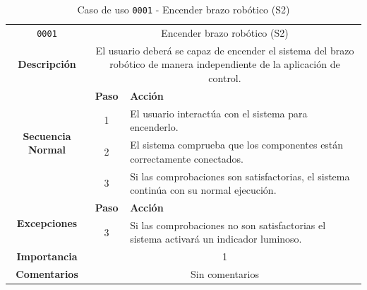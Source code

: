 \begin{table}[H]
    \centering
    \begin{tabularx}{\textwidth}{|c|c|X|}
        \cline{1-3}
        \texttt{0001}                              & \multicolumn{2}{c|}{Encender brazo robótico (S2)}                                                                                                                      \\ \cline{1-3}
        \textbf{Descripción}                       & \multicolumn{2}{m{13cm}|}{El usuario deberá se capaz de encender el sistema del brazo robótico de manera independiente de la aplicación de control.}
        \\ \cline{1-3}
        \multirow{4}{*}{\textbf{Secuencia Normal}} & \textbf{Paso}                                                                                                                                        & \textbf{Acción}
        \\ \cline{2-3}                    &   1  & El usuario interactúa con el sistema para encenderlo.
        \\ \cline{2-3}                    &   2  & El sistema comprueba que los componentes están correctamente conectados.
        \\ \cline{2-3}                    &   3  & Si las comprobaciones son satisfactorias, el sistema continúa con su normal ejecución.
        \\ \cline{1-3}
        \multirow{2}{*}{\textbf{Excepciones}}      & \textbf{Paso}                                                                                                                                        & \textbf{Acción}
        \\ \cline{2-3}                    &   3  & Si las comprobaciones no son satisfactorias el sistema activará un indicador luminoso.
        \\ \cline{1-3}
        \textbf{Importancia}                       & \multicolumn{2}{c|}{1}                                                                                                                                                 \\ \cline{1-3}
        \textbf{Comentarios}                       & \multicolumn{2}{c|}{Sin comentarios}                                                                                                                                   \\ \cline{1-3}
    \end{tabularx}
    \caption{Caso de uso \texttt{0001} - Encender brazo robótico (S2)}
\end{table}

